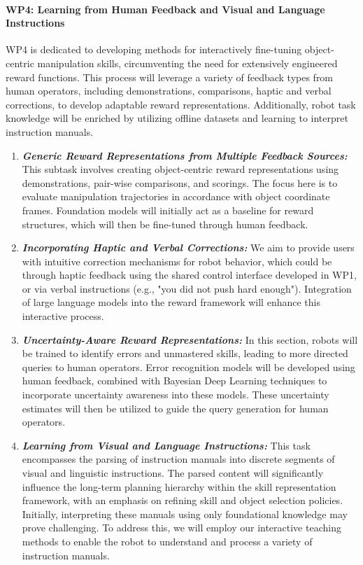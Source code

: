 \begin{refsection}
\paragraph{WP4: Learning from Human Feedback and Visual and Language Instructions}
WP4 is dedicated to developing methods for interactively fine-tuning object-centric manipulation skills, circumventing the need for extensively engineered reward functions. This process will leverage a variety of feedback types from human operators, including demonstrations, comparisons, haptic and verbal corrections, to develop adaptable reward representations. Additionally, robot task knowledge will be enriched by utilizing offline datasets and learning to interpret instruction manuals. 
\begin{enumerate}[noitemsep, topsep=0pt, partopsep=0pt, label=\alph*), leftmargin=0em, itemindent=1em, labelindent=1em, labelwidth=*]
\item \textit{\textbf{Generic Reward Representations from Multiple Feedback Sources:}} This subtask involves creating object-centric reward representations using demonstrations, pair-wise comparisons, and scorings. The focus here is to evaluate manipulation trajectories in accordance with object coordinate frames. Foundation models will initially act as a baseline for reward structures, which will then be fine-tuned through human feedback. 
\item \textit{\textbf{Incorporating Haptic and Verbal Corrections:}} We aim to provide users with intuitive correction mechanisms for robot behavior, which could be through haptic feedback using the shared control interface developed in WP1, or via verbal instructions (e.g., "you did not push hard enough"). Integration of large language models into the reward framework will enhance this interactive process. 
\item \textit{\textbf{Uncertainty-Aware Reward Representations:}} In this section, robots will be trained to identify errors and unmastered skills, leading to more directed queries to human operators. Error recognition models will be developed using human feedback, combined with Bayesian Deep Learning techniques to incorporate uncertainty awareness into these models. These uncertainty estimates will then be utilized to guide the query generation for human operators. 
\item \textit{\textbf{Learning from Visual and Language Instructions:}} This task encompasses the parsing of instruction manuals into discrete segments of visual and linguistic instructions. The parsed content will significantly influence the long-term planning hierarchy within the skill representation framework, with an emphasis on refining skill and object selection policies. Initially, interpreting these manuals using only foundational knowledge may prove challenging. To address this, we will employ our interactive teaching methods to enable the robot to understand and process a variety of instruction manuals. 
\end{enumerate}


\end{refsection}
